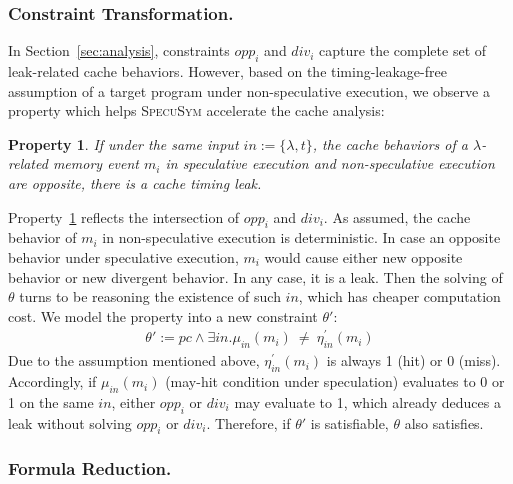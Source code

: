 \documentclass[sigconf,screen]{acmart}
\newcommand{\pcon}{\mathit{pc}}
\newcommand{\SpecuSym}{\textsc{SpecuSym} }
\newtheorem{pro}{Property}
\begin{document}
\subsubsection{Constraint Transformation.}
In Section~\ref{sec:analysis}, constraints $\mathit{opp_i}$ and $\mathit{div_i}$
capture the complete set of leak-related cache behaviors. However, based on the
timing-leakage-free assumption of a target program under non-speculative execution,
we observe a property which helps \SpecuSym accelerate the cache analysis:
%
\begin{pro}
  \label{pro:p2}
  If under the same input $\mathit{in:=\{\lambda,t\}}$, the cache behaviors of a 
	$\lambda$-related	memory event $\mathit{m_i}$ in speculative execution and 
	non-speculative execution are opposite, there is a cache timing leak. 
\end{pro}
%
Property~\ref{pro:p2} reflects the intersection of $\mathit{opp_i}$ and 
$\mathit{div_i}$. As assumed, the cache behavior of $\mathit{m_i}$ in 
non-speculative execution is deterministic. In case an opposite behavior 
under speculative execution, $\mathit{m_i}$ would cause either new opposite 
behavior or new divergent behavior. In any case, it is a leak. Then the 
solving of $\theta$ turns to be reasoning the existence of such $\mathit{in}$, 
which has cheaper computation cost. We model the property into a new constraint 
$\theta'$:  
%
\begin{multline}
  \label{eqn:leak}
  ~~~~~~~~~~~~~~~
  \theta':=
	\pcon\wedge
  \exists\mathit{in}.
  \mathit{
    \mu_{in}(m_i)~\neq~\eta_{in}^\prime(m_i)
  }
  ~~~~~~~~~~~~~~~
\end{multline}
%
Due to the assumption mentioned above, $\mathit{\eta_{in}^\prime(m_i)}$ 
is always 1 (hit) or 0 (miss). Accordingly, if $\mathit{\mu_{in}(m_i)}$
(may-hit condition under speculation) evaluates to 0 or 1 on the same 
$\mathit{in}$, either $\mathit{opp_i}$ or $\mathit{div_i}$ may evaluate 
to 1, which already deduces a leak without solving $\mathit{opp_i}$ or 
$\mathit{div_i}$. Therefore, if $\theta'$ is satisfiable, $\theta$ also 
satisfies. 


\subsubsection{Formula Reduction.}
\end{document}
